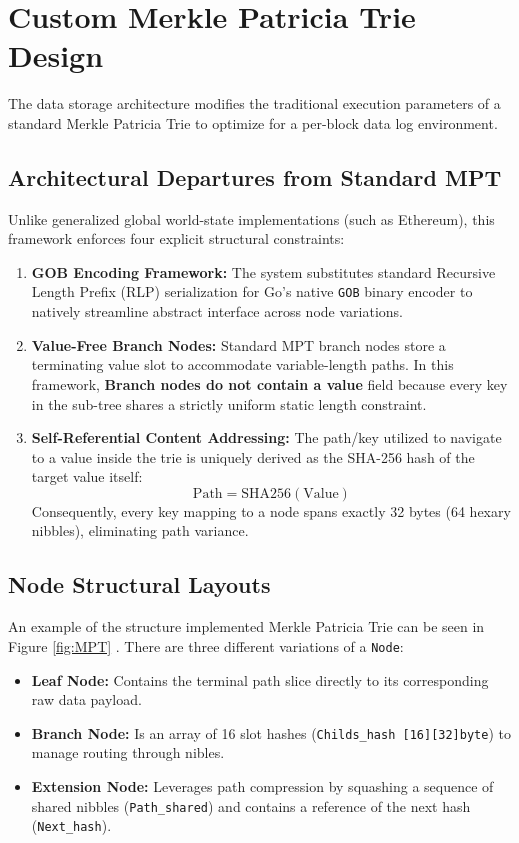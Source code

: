 \documentclass[10pt, conference]{IEEEtran}
\begin{document}
	\section{Custom Merkle Patricia Trie Design}
	The data storage architecture modifies the traditional execution parameters of a standard Merkle Patricia Trie to optimize for a per-block data log environment.
	
	\subsection{Architectural Departures from Standard MPT}
	Unlike generalized global world-state implementations (such as Ethereum), this framework enforces four explicit structural constraints:
	\begin{enumerate}
		\item \textbf{GOB Encoding Framework:} The system substitutes standard Recursive Length Prefix (RLP) \cite{wood2014ethereum} serialization for Go's native \texttt{GOB} \cite{gob} binary encoder to natively streamline abstract interface across node variations.
		\item \textbf{Value-Free Branch Nodes:} Standard MPT branch nodes store a terminating value slot to accommodate variable-length paths. In this framework, \textbf{Branch nodes do not contain a value} field because every key in the sub-tree shares a strictly uniform static length constraint.
		\item \textbf{Self-Referential Content Addressing:} The path/key utilized to navigate to a value inside the trie is uniquely derived as the SHA-256 hash of the target value itself:
		$$\text{Path} = \text{SHA256}(\text{Value})$$
		Consequently, every key mapping to a node spans exactly 32 bytes (64 hexary nibbles), eliminating path variance.
	\end{enumerate}
	
	\subsection{Node Structural Layouts}
	An example of the structure implemented Merkle Patricia Trie can be seen in Figure \ref{fig:MPT} . There are three different variations of a \texttt{Node}:
	
	\begin{itemize}
		\item \textbf{Leaf Node:} Contains the terminal path slice directly to its corresponding raw data payload.
		\item \textbf{Branch Node:} Is an array of 16 slot hashes (\texttt{Childs\_hash [16][32]byte}) to manage routing through nibles.
		\item \textbf{Extension Node:} Leverages path compression by squashing a sequence of shared nibbles (\texttt{Path\_shared}) and contains a reference of the next hash (\texttt{Next\_hash}).
	\end{itemize}
	
\end{document}
